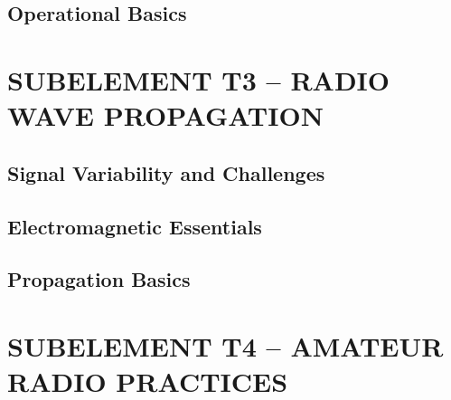 \documentclass[12pt]{book}
\begin{document}
\section{Operational Basics}











\chapter{SUBELEMENT T3 – RADIO WAVE PROPAGATION}
\section{Signal Variability and Challenges}












\section{Electromagnetic Essentials}











\section{Propagation Basics}











\chapter{SUBELEMENT T4 – AMATEUR RADIO PRACTICES}
\end{document}
